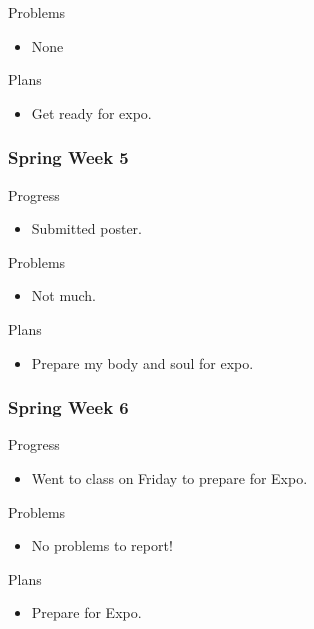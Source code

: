         \noindent
        Problems
        \begin{itemize}
            \item None
        \end{itemize}
        
        \noindent
        Plans
        \begin{itemize}
            \item Get ready for expo.
        \end{itemize}
    \subsubsection{Spring Week 5}
        \noindent
        Progress
        \begin{itemize}
            \item Submitted poster.
        \end{itemize}
        
        \noindent
        Problems
        \begin{itemize}
            \item Not much.
        \end{itemize}
        
        \noindent
        Plans
        \begin{itemize}
            \item Prepare my body and soul for expo.
        \end{itemize}
    \subsubsection{Spring Week 6}
        \noindent
        Progress
        \begin{itemize}
            \item Went to class on Friday to prepare for Expo.
        \end{itemize}
        
        \noindent
        Problems
        \begin{itemize}
            \item No problems to report!
        \end{itemize}
        
        \noindent
        Plans
        \begin{itemize}
            \item Prepare for Expo.
        \end{itemize}
